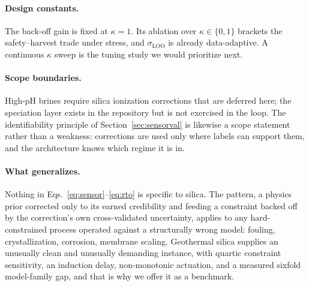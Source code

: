 \paragraph{Design constants.} The back-off gain is fixed at
$\kappa = 1$. Its ablation over $\kappa \in \{0,1\}$ brackets the
safety--harvest trade under stress, and $\sigma_{\mathrm{LOO}}$ is
already data-adaptive. A continuous $\kappa$ sweep is the tuning study we
would prioritize next.

\paragraph{Scope boundaries.} High-pH brines require silica ionization
corrections that are deferred here; the speciation layer exists in the
repository but is not exercised in the loop. The identifiability
principle of Section~\ref{sec:sensorval} is likewise a scope statement
rather than a weakness: corrections are used only where labels can
support them, and the architecture knows which regime it is in.

\paragraph{What generalizes.} Nothing in
Eqs.~\eqref{eq:sensor}--\eqref{eq:rto} is specific to silica. The
pattern, a physics prior corrected only to its earned credibility and
feeding a constraint backed off by the correction's own cross-validated
uncertainty, applies to any hard-constrained process operated against a
structurally wrong model: fouling, crystallization, corrosion, membrane
scaling. Geothermal silica supplies an unusually clean and unusually
demanding instance, with quartic constraint sensitivity, an induction
delay, non-monotonic actuation, and a measured sixfold model-family
gap, and that is why we offer it as a benchmark.
